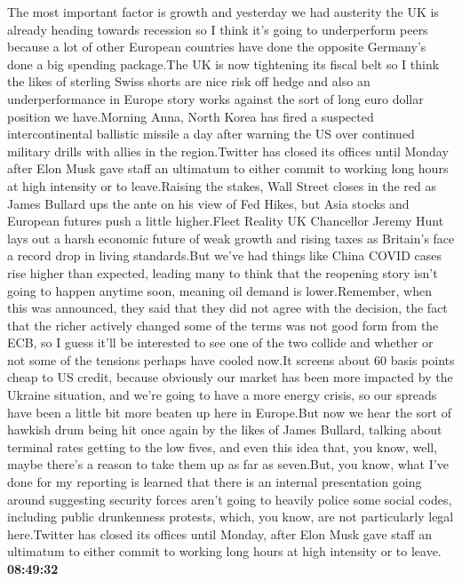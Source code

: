 \documentclass{article}%
\begin{document}
The most important factor is growth and yesterday we had austerity the UK is already heading towards recession so I think it's going to underperform peers because a lot of other European countries have done the opposite Germany's done a big spending package.The UK is now tightening its fiscal belt so I think the likes of sterling Swiss shorts are nice risk off hedge and also an underperformance in Europe story works against the sort of long euro dollar position we have.Morning Anna, North Korea has fired a suspected intercontinental ballistic missile a day after warning the US over continued military drills with allies in the region.Twitter has closed its offices until Monday after Elon Musk gave staff an ultimatum to either commit to working long hours at high intensity or to leave.Raising the stakes, Wall Street closes in the red as James Bullard ups the ante on his view of Fed Hikes, but Asia stocks and European futures push a little higher.Fleet Reality UK Chancellor Jeremy Hunt lays out a harsh economic future of weak growth and rising taxes as Britain's face a record drop in living standards.But we've had things like China COVID cases rise higher than expected, leading many to think that the reopening story isn't going to happen anytime soon, meaning oil demand is lower.Remember, when this was announced, they said that they did not agree with the decision, the fact that the richer actively changed some of the terms was not good form from the ECB, so I guess it'll be interested to see one of the two collide and whether or not some of the tensions perhaps have cooled now.It screens about 60 basis points cheap to US credit, because obviously our market has been more impacted by the Ukraine situation, and we're going to have a more energy crisis, so our spreads have been a little bit more beaten up here in Europe.But now we hear the sort of hawkish drum being hit once again by the likes of James Bullard, talking about terminal rates getting to the low fives, and even this idea that, you know, well, maybe there's a reason to take them up as far as seven.But, you know, what I've done for my reporting is learned that there is an internal presentation going around suggesting security forces aren't going to heavily police some social codes, including public drunkenness protests, which, you know, are not particularly legal here.Twitter has closed its offices until Monday, after Elon Musk gave staff an ultimatum to either commit to working long hours at high intensity or to leave.%
\textbf{08:49:32}%
\newline%
\end{document}
